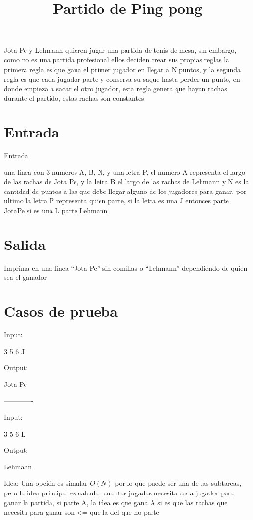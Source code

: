 \documentclass{article}
\title{Partido de Ping pong}
\begin{document}
\maketitle

Jota Pe y Lehmann quieren jugar una partida de tenis de mesa, sin embargo, como no es una partida profesional ellos deciden crear sus propias reglas
la primera regla es que gana el primer jugador en llegar a N puntos, y la segunda regla es que cada jugador parte y conserva su saque hasta perder
un punto, en donde empieza a sacar el otro jugador, esta regla genera que hayan rachas durante el partido, estas rachas son constantes

\section*{Entrada}
Entrada

una linea con 3 numeros A, B, N, y una letra P, el numero A representa el largo de las rachas de Jota Pe, y la letra B el largo de las rachas de Lehmann
y N es la cantidad de puntos a las que debe llegar alguno de los jugadores para ganar, por ultimo la letra P representa quien parte, si la letra es una J
entonces parte JotaPe si es una L parte Lehmann


\section*{Salida}

Imprima en una linea ``Jota Pe'' sin comillas o ``Lehmann'' dependiendo de quien sea el ganador

\section*{Casos de prueba}

Input:

3 5 6 J

Output:

Jota Pe

-------------

Input:

3 5 6 L

Output:

Lehmann

Idea: Una opción es simular $O(N)$ por lo que puede ser una de las subtareas, pero la idea principal es calcular cuantas jugadas necesita cada jugador
para ganar la partida, si parte A, la idea es que gana A si es que las rachas que necesita para ganar son <= que la del que no parte
\end{document}
